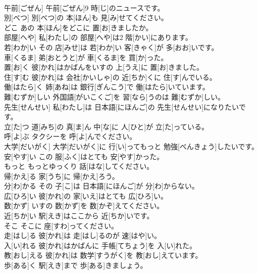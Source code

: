 \documentclass[8pt]{extreport}
\begin{document}
\begin{CJK}{UTF8}{min}
\\	午前[ごぜん]	午前[ごぜん]9 時[じ]のニュースです。		
\\	別[べつ]	別[べつ]の 本[ほん]も 見[み]せてください。		
\\	どこ	あの 本[ほん]をどこに 置[お]きましたか。		
\\	部屋[へや]	私[わたし]の 部屋[へや]は2 階[かい]にあります。		
\\	若[わか]い	その 店[みせ]は 若[わか]い 客[きゃく]が 多[おお]いです。		
\\	車[くるま]	弟[おとうと]が 車[くるま]を 買[か]った。		
\\	置[お]く	彼[かれ]はかばんをいすの 上[うえ]に 置[お]きました。		
\\	住[す]む	彼[かれ]は 会社[かいしゃ]の 近[ちか]くに 住[す]んでいる。		
\\	働[はたら]く	姉[あね]は 銀行[ぎんこう]で 働[はたら]いています。		
\\	難[むずか]しい	外国語[がいこくご]を 習[なら]うのは 難[むずか]しい。		
\\	先生[せんせい]	私[わたし]は 日本語[にほんご]の 先生[せんせい]になりたいです。		
\\	立[た]つ	道[みち]の 真[ま]ん 中[な]に 人[ひと]が 立[た]っている。		
\\	呼[よ]ぶ	タクシーを 呼[よ]んでください。		
\\	大学[だいがく]	大学[だいがく]に 行[い]ってもっと 勉強[べんきょう]したいです。		
\\	安[やす]い	この 服[ふく]はとても 安[やす]かった。		
\\	もっと	もっとゆっくり 話[はな]してください。		
\\	帰[かえ]る	家[うち]に 帰[かえ]ろう。		
\\	分[わ]かる	その 子[こ]は 日本語[にほんご]が 分[わ]からない。		
\\	広[ひろ]い	彼[かれ]の 家[いえ]はとても 広[ひろ]い。		
\\	数[かず]	いすの 数[かず]を 数[かぞ]えてください。		
\\	近[ちか]い	駅[えき]はここから 近[ちか]いです。		
\\	そこ	そこに 座[すわ]ってください。		
\\	走[はし]る	彼[かれ]は 走[はし]るのが 速[はや]い。		
\\	入[い]れる	彼[かれ]はかばんに 手帳[てちょう]を 入[い]れた。		
\\	教[おし]える	彼[かれ]は 数学[すうがく]を 教[おし]えています。		
\\	歩[ある]く	駅[えき]まで 歩[ある]きましょう。		

\end{CJK}
\end{document}
